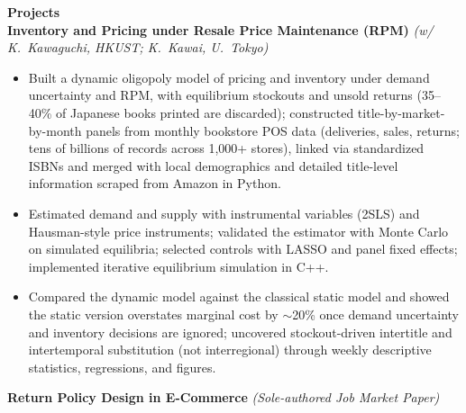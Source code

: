 \documentclass[11pt,letterpaper]{article}
\begin{document}
{\large \textbf{Projects}}\\[-0.5pt]
\textbf{Inventory and Pricing under Resale Price Maintenance (RPM)} \textit{(w/ K.\ Kawaguchi, HKUST; K.\ Kawai, U.\ Tokyo)}\\
\vspace{-6pt}
\begin{itemize}
  \item Built a dynamic oligopoly model of pricing and inventory under demand uncertainty and RPM, with equilibrium stockouts and unsold returns (35--40\% of Japanese books printed are discarded); constructed title-by-market-by-month panels from monthly bookstore POS data (deliveries, sales, returns; tens of billions of records across 1{,}000+ stores), linked via standardized ISBNs and merged with local demographics and detailed title-level information scraped from Amazon in Python.
  \item Estimated demand and supply with instrumental variables (2SLS) and Hausman-style price instruments; validated the estimator with Monte Carlo on simulated equilibria; selected controls with LASSO and panel fixed effects; implemented iterative equilibrium simulation in C++.
  \item Compared the dynamic model against the classical static model and showed the static version overstates marginal cost by \(\sim\)20\% once demand uncertainty and inventory decisions are ignored; uncovered stockout-driven intertitle and intertemporal substitution (not interregional) through weekly descriptive statistics, regressions, and figures.
\end{itemize}
\vspace{-3pt}
\textbf{Return Policy Design in E-Commerce} \textit{(Sole-authored Job Market Paper)}\\
\vspace{-6pt}
\end{document}
